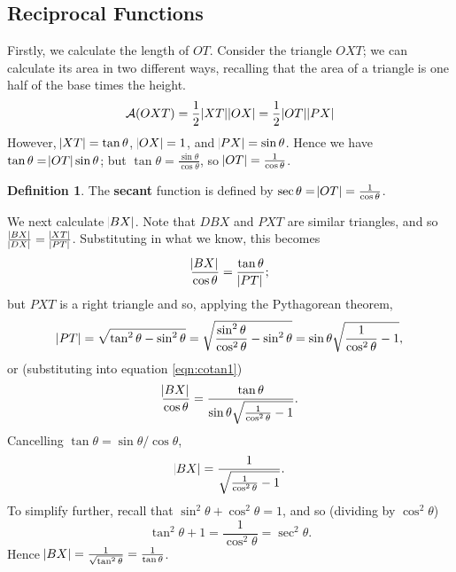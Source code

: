 \documentclass[a4paper,leqno]{article}
\numberwithin{equation}{section}
\theoremstyle{definition}
\newtheorem{defn}[equation]{Definition}
\theoremstyle{remark}
\newcommand{\df}[1]{\textbf{#1}}
\begin{document}
\subsection{Reciprocal Functions}
Firstly, we calculate the length of $ OT $. Consider the triangle $ OXT $; we can calculate its area in two different ways,
recalling that the area of a triangle is one half of the base times the height.
\begin{displaymath}
  \mathcal{A}(OXT) = \frac{1}{2}\abs{XT}\abs{OX} = \frac{1}{2}\abs{OT}\abs{PX}
\end{displaymath}
However, $ \abs{XT} = \tan \theta $, $ \abs{OX} = 1 $, and $ \abs{PX} = \sin \theta $. Hence we
have $ \tan \theta = \abs{OT}\sin \theta $; but $ \tan \theta = \frac{\sin \theta}{\cos \theta} $,
so $ \abs{OT} = \frac{1}{\cos \theta} $.
\begin{defn}
  The \df{secant} function is defined by $ \sec \theta = \abs{OT} = \frac{1}{\cos \theta} $.
\end{defn}

We next calculate $ \abs{BX} $. Note that $ DBX $ and $ PXT $ are similar triangles, and so $ \frac{\abs{BX}}{\abs{DX}} = \frac{\abs{XT}}{\abs{PT}} $.
Substituting in what we know, this becomes
\begin{equation}\label{eqn:cotan1}
  \frac{\abs{BX}}{\cos \theta} = \frac{\tan \theta}{\abs{PT}};
\end{equation}
but $ PXT $ is a right triangle and so, applying the Pythagorean theorem,
\begin{displaymath}
  \abs{PT} = \sqrt{\tan^2 \theta - \sin^2 \theta} = \sqrt{\frac{\sin^2 \theta}{\cos^2 \theta} - \sin^2 \theta} = \sin \theta \sqrt{\frac{1}{\cos^2 \theta} - 1},
\end{displaymath}
or (substituting into equation \ref{eqn:cotan1})
\begin{displaymath}
  \frac{\abs{BX}}{\cos \theta} = \frac{\tan\theta}{\sin\theta \sqrt{\frac{1}{\cos^2 \theta} - 1}}.
\end{displaymath}
Cancelling $ \tan \theta = \sin \theta/\cos \theta $,
\begin{displaymath}
  \abs{BX} = \frac{1}{\sqrt{\frac{1}{\cos^2 \theta} - 1}}.
\end{displaymath}
To simplify further, recall that $ \sin^2 \theta + \cos^2 \theta = 1 $, and so (dividing by $ \cos^2 \theta $)
\begin{equation}\label{eqn:tansecid}
  \tan^2 \theta + 1 = \frac{1}{\cos^2 \theta} = \sec^2 \theta.
\end{equation}
Hence $ \abs{BX} = \frac{1}{\sqrt{\tan^2 \theta}} = \frac{1}{\tan \theta} $.
\end{document}
